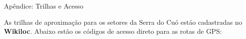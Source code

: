 \clearpage
{}
{}





\clearpage
{}
{}

\vspace*{2em}\noindent
{\color{brand_color}\CGSectorTitleFont Apêndice: Trilhas e Acesso}\par\vspace{1.5em}

{\CGBodyFont
As trilhas de aproximação para os setores da Serra do Cuó estáo cadastradas no \textbf{Wikiloc}. Abaixo estão os códigos de acesso direto para as rotas de GPS:
}
\vspace{2em}

